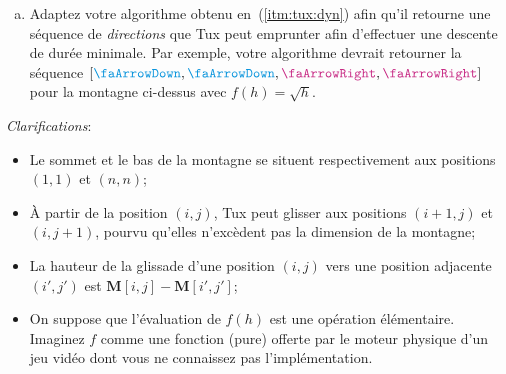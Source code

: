 \documentclass{article}
\newcommand{\mat}[1]{\mathbf{#1}}                %
\begin{document}
\begin{question}
\begin{enumerate}[(a)]
  \item Adaptez  votre algorithme obtenu
    en~(\ref{itm:tux:dyn}) afin qu'il retourne une séquence
    de \emph{directions} que Tux peut emprunter afin d'effectuer une
    descente de durée minimale. Par exemple, votre algorithme devrait
    retourner la séquence
    $[\text{\dbas}, \text{\dbas}, \text{\ddroite}, \text{\ddroite}]$
    pour la montagne ci-dessus avec $f(h) = \sqrt{h}$.
  \end{enumerate}

  \vspace*{15pt}
  
  \emph{Clarifications}:\medskip
  \begin{itemize}
    \setlength\itemsep{15pt}

  \item Le sommet et le bas de la montagne se situent respectivement
    aux positions $(1, 1)$ et $(n, n)$;
    
  \item À partir de la position $(i, j)$, Tux peut glisser aux
    positions $(i + 1, j)$ et $(i, j + 1)$, pourvu qu'elles n'excèdent
    pas la dimension de la montagne;

  \item La hauteur de la glissade d'une position $(i, j)$ vers une
    position adjacente $(i', j')$ est $\mat{M}[i, j] - \mat{M}[i',
      j']$;
    
  \item On suppose que l'évaluation de $f(h)$ est une opération
    élémentaire. Imaginez $f$ comme une fonction (pure) offerte par le
    moteur physique d'un jeu vidéo dont vous ne connaissez pas
    l'implémentation.
       
  \end{itemize}

\end{question}

\pagebreak

\newcommand{\potion}[3]{%
  \raisebox{-5pt}{\begin{tikzpicture}[scale=#1, transform shape, #2]%
    \node[inner sep=1pt] at (0, 0) {\faFlask};
    \fill[gray!15, fill opacity=0.6] (0, -0.068) circle (2pt);
    \node[scale=0.45, black] at (0, -0.066) {\textbf{\textsf{#3}}};
  \end{tikzpicture}}%
}
\newcommand{\potionp}[3]{\raisebox{-2pt}{\potion{#1}{#2}{#3}}}
\end{document}
